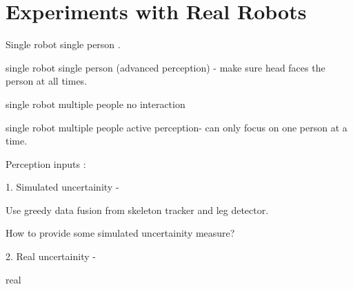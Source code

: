 \section{Experiments with Real Robots}

Single robot single person .

single robot single person (advanced perception) - make sure head faces the person at all times.

single robot multiple people no interaction

single robot multiple people active perception- can only focus on one person at a time. 

Perception inputs : 

1. Simulated uncertainity -  

Use greedy data fusion from skeleton tracker and leg detector.

How to provide some simulated uncertainity measure?


2. Real uncertainity - 



\label{sec:results}
real
